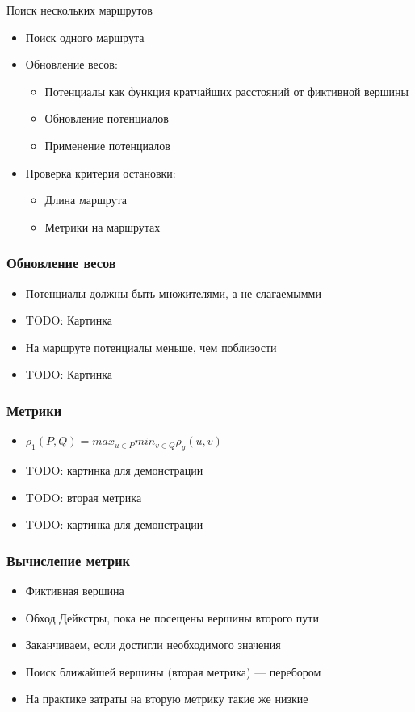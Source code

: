 \documentclass[mathserif]{beamer}
\begin{document}
\begin{frame}{Поиск нескольких маршрутов}
    \begin{itemize}
        \item Поиск одного маршрута
        \item Обновление весов:
        \begin{itemize}
            \item Потенциалы как функция кратчайших расстояний от фиктивной вершины 
            \item Обновление потенциалов
            \item Применение потенциалов
        \end{itemize}
        \item Проверка критерия остановки:
        \begin{itemize}
            \item Длина маршрута
            \item Метрики на маршрутах
        \end{itemize}
    \end{itemize}
\end{frame}

\begin{frame}
    \frametitle{Обновление весов}
    \begin{itemize}
        \item Потенциалы должны быть множителями, а не слагаемымми
        \item TODO: Картинка
        \item На маршруте потенциалы меньше, чем поблизости
        \item TODO: Картинка
    \end{itemize}
\end{frame}

\begin{frame}
    \frametitle{Метрики}
    \begin{itemize}
        \item $\rho_1 (P, Q) = max_{u \in P} min_{v \in Q} \rho_g(u, v)$
        \item TODO: картинка для демонстрации
        \item TODO: вторая метрика
        \item TODO: картинка для демонстрации
    \end{itemize}
\end{frame}

\begin{frame}
    \frametitle{Вычисление метрик}
    \begin{itemize}
        \item Фиктивная вершина
        \item Обход Дейкстры, пока не посещены вершины второго пути 
        \item Заканчиваем, если достигли необходимого значения
        \item Поиск ближайшей вершины (вторая метрика) — перебором
        \item На практике затраты на вторую метрику такие же низкие
    \end{itemize}
\end{frame}
\end{document}
